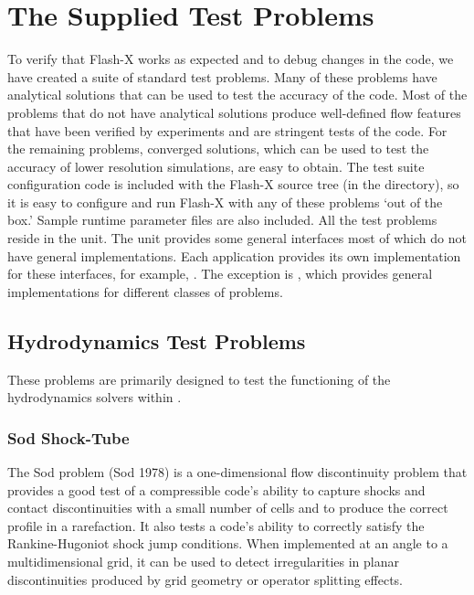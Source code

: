\chapter{The Supplied Test Problems}
\label{Sec:The supplied problems}

To verify that Flash-X works as expected and to debug changes in the code, we
have created a suite of standard test problems. Many of these problems have
analytical solutions that can be used to test the accuracy of the code. Most
of the problems that do not have analytical solutions produce
well-defined flow features that have been verified by experiments and are
stringent tests of the code. For the remaining problems, converged solutions,
which can be used to test the accuracy of lower resolution simulations, are
easy to obtain.  The test suite configuration code is included
with the Flash-X source tree (in the  directory), so it is easy
to configure and run Flash-X with any of these problems `out of the box.'
Sample runtime parameter files are also included. All the test
problems reside in the  unit. The unit provides some
general interfaces most of which do not have general
implementations. Each application provides its own implementation for
these interfaces, for example, . The
exception is , which provides general
implementations for different classes of problems. 

\section{Hydrodynamics Test Problems}
These problems are primarily designed to test the functioning of the
hydrodynamics solvers within \flashx.

\subsection{Sod Shock-Tube}
\label{Sec:SimulationSod}

The Sod problem (Sod 1978) is a one-dimensional flow
discontinuity problem that provides a good test of a compressible code's
ability to capture shocks and contact discontinuities with a small number of
cells and to produce the correct profile in a rarefaction. It also
tests a code's ability to correctly satisfy the Rankine-Hugoniot shock
jump conditions. When implemented at an angle to a multidimensional grid,
it can be used to detect irregularities in planar discontinuities produced
by grid geometry or operator splitting effects.

